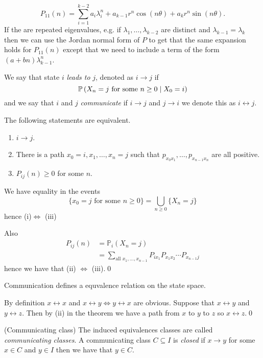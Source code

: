 \documentclass{article}
\begin{document}
\[
	P_{11}(n)=\sum_{i=1}^{k-2}a_i\lambda_i^n+a_{k-1}r^n\cos(n\theta)+a_kr^n\sin(n\theta).
\]
If the are repeated eigenvalues, e.g. if $ \lambda_1,\dots, \lambda_{k-2} $ are distinct and $ \lambda_{k-1}=\lambda_k $ then we can use the Jordan normal form of $ P $ to get that the same expansion holds for $ P_{11}(n) $ except that we need to include a term of the form $ (a+bn)\lambda^n_{k-1} $.
\begin{definition}
	We say that state $ i $ \textit{leads to} $ j $, denoted as $ i\to j $ if
	\[
		\mathbb{P}\left({X_n=j\text{ for some $ n\ge 0 $}\mid X_0=i}\right)
	\]
	and we say that $ i $ and $ j $ \textit{communicate} if $ i\to j $ and $ j\to i $ we denote this as $ i\longleftrightarrow j $.
\end{definition}
\begin{theorem}
  The following statements are equivalent.
  \begin{enumerate}
	  \item $ i\to j $.
	  \item There is a path $ x_0=i,x_1,\dots, x_n=j $ such that $ p_{x_0x_1},\dots,p_{x_{n-1}x_n} $ are all positive.
	  \item $ P_{ij}(n)\ge 0 $ for some $ n $.
  \end{enumerate}
\end{theorem}
  \pf We have equality in the events
  \[
	  \{x_0=j\text{ for some } n\ge 0 \}=\bigcup_{n\ge 0}\{X_n=j\}
  \]
  hence (i)$ \iff $ (iii)\par
  Also
  \begin{align*}
	  P_{ij}(n)&=\mathbb P_i(X_n=j) \\
		   &= \sum_{\text{all } x_1,\dots, x_{n-1}}P_{ix_1}P_{x_1x_2}\cdots P_{x_{n-1}j}
  \end{align*}
  hence we have that (ii) $ \iff $ (iii).\qed
\begin{corollary}
  Communication defines a equvalence relation on the state space.
\end{corollary}
\pf
By definition $ x\longleftrightarrow x $ and $ x\longleftrightarrow y \iff y\longleftrightarrow x $ are obvious. Suppose that $ x\longleftrightarrow y $ and $ y\longleftrightarrow z $. Then by (ii) in the theorem we have a path from $ x $ to $ y $ to $ z $ so $ x\longleftrightarrow z $.\qed
\begin{definition}
	(Communicating class) The induced equivalences classes are called \textit{communicating classes}. A communicating class $ C\subseteq I $ is \textit{closed} if $ x\to y $ for some $ x\in C $ and $ y\in I $ then we have that $ y\in C $.
\end{definition}
\end{document}
